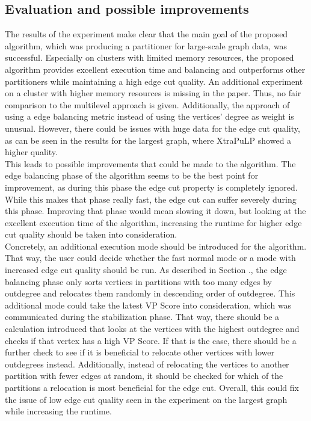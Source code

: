 \documentclass[acmsmall,nonacm,screen,review]{acmart}
\begin{document}
\subsection{Evaluation and possible improvements}
The results of the experiment make clear that the main goal of the proposed algorithm, which was producing a partitioner for large-scale graph data, was successful. Especially on clusters with limited memory resources, the proposed algorithm provides excellent execution time and balancing and outperforms other partitioners while maintaining a high edge cut quality. An additional experiment on a cluster with higher memory resources is missing in the paper. Thus, no fair comparison to the multilevel approach is given. Additionally, the approach of using a edge balancing metric instead of using the vertices' degree as weight is unusual. However, there could be issues with huge data for the edge cut quality, as can be seen in the results for the largest graph, where XtraPuLP showed a higher quality. \\
This leads to possible improvements that could be made to the algorithm. The edge balancing phase of the algorithm seems to be the best point for improvement, as during this phase the edge cut property is completely ignored. While this makes that phase really fast, the edge cut can suffer severely during this phase. Improving that phase would mean slowing it down, but looking at the excellent execution time of the algorithm, increasing the runtime for higher edge cut quality should be taken into consideration. \\
Concretely, an additional execution mode should be introduced for the algorithm. That way, the user could decide whether the fast normal mode or a mode with increased edge cut quality should be run. As described in Section ., the edge balancing phase only sorts vertices in partitions with too many edges by outdegree and relocates them randomly in descending order of outdegree. This additional mode could take the latest VP Score into consideration, which was communicated during the stabilization phase. That way, there should be a calculation introduced that looks at the vertices with the highest outdegree and checks if that vertex has a high VP Score. If that is the case, there should be a further check to see if it is beneficial to relocate other vertices with lower outdegrees instead. Additionally, instead of relocating the vertices to another partition with fewer edges at random, it should be checked for which of the partitions a relocation is most beneficial for the edge cut. Overall, this could fix the issue of low edge cut quality seen in the experiment on the largest graph while increasing the runtime. 
\end{document}
